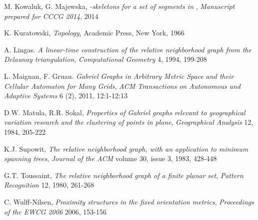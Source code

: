 \documentclass[11pt]{llncs}
\begin{document}
\begin{thebibliography}{99999}
M. Kowaluk, G. Majewska,
\textit{-skeletons for a set of segments in },
\textit{Manuscript prepared for CCCG 2014}, 2014

K. Kuratowski,
\textit{Topology},
Academic Press, New York, 1966

A. Lingas. 
\textit {A linear-time construction of the relative neighborhood graph 
from the Delaunay triangulation}, 
\textit{Computational Geometry} 4, 1994, 199-208

L. Maignan, F. Gruau. 
\textit {Gabriel Graphs in Arbitrary Metric Space and their Cellular Automaton for Many Grids}, 
\textit{ACM Transactions on Autonomous and Adaptive Systems} 6 (2), 2011, 12:1-12:13
 
D.W. Matula, R.R. Sokal, 
\textit{Properties of Gabriel graphs relevant to geographical variation research 
and the clustering of points in plane}, 
\textit{Geographical Analysis} 12, 1984, 205-222

K.J. Supowit, 
\textit{The relative neighborhood graph, with an application to minimum spanning trees}, 
\textit{Journal of the ACM} volume 30, issue 3, 1983, 428-448

G.T. Toussaint, 
\textit{The relative neighborhood graph of a finite planar set}, 
\textit{Pattern Recognition} 12, 1980, 261-268 

C. Wulff-Nilsen, 
\textit{Proximity structures in the fixed orientation metrics}, 
\textit{Proceedings of the EWCG 2006} 2006, 153-156

\end{thebibliography}
\end{document}
